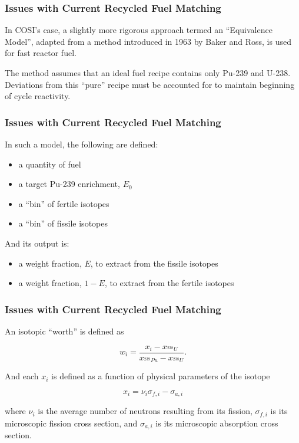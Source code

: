 \begin{frame}[ctb!]
  \frametitle{Issues with Current Recycled Fuel Matching}

  In COSI's case, a slightly more rigorous approach termed an ``Equivalence
  Model'', adapted from a method introduced in 1963 by Baker and
  Ross\cite{baker_comparison_1963}, is used for fast reactor fuel.
  
  \vspace{0.2cm}

  The method assumes that an ideal fuel recipe contains only Pu-239 and
  U-238. Deviations from this ``pure'' recipe must be accounted for to maintain
  beginning of cycle reactivity.
\end{frame}

\begin{frame}[ctb!]
  \frametitle{Issues with Current Recycled Fuel Matching}

  In such a model, the following are defined:
  \begin{itemize}
    \item a quantity of fuel
    \item a target Pu-239 enrichment, $E_0$
    \item a ``bin'' of fertile isotopes
    \item a ``bin'' of fissile isotopes
  \end{itemize}

  And its output is:
  \begin{itemize}
    \item a weight fraction, $E$, to extract from the fissile isotopes
    \item a weight fraction, $1-E$, to extract from the fertile isotopes
  \end{itemize}
\end{frame}

\begin{frame}[ctb!]
  \frametitle{Issues with Current Recycled Fuel Matching}
  An isotopic ``worth'' is defined as
  
  \begin{equation}
    w_i = \frac{x_i - x_{^{238}U}}
    {x_{^{239}Pu} - x_{^{238}U}}.
  \end{equation}

  And each $x_i$ is defined as a function of physical parameters of the isotope
  
  \begin{equation}
    x_i = \nu_{i} \sigma_{f,i} - \sigma_{a,i}
  \end{equation}

  where $\nu_{i}$ is the average number of neutrons resulting from its fission,
  $\sigma_{f,i}$ is its microscopic fission cross section, and $\sigma_{a,i}$ is
  its microscopic absorption cross section.
\end{frame}


